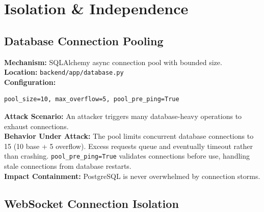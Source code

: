 \documentclass[11pt,a4paper]{article}
\begin{document}
\section{Isolation \& Independence}

\subsection{Database Connection Pooling}

\begin{tcolorbox}[colback=toleranceamber!5, colframe=toleranceamber]
\textbf{Mechanism:} SQLAlchemy async connection pool with bounded size.\\
\textbf{Location:} \texttt{backend/app/database.py}\\
\textbf{Configuration:}
\begin{verbatim}
pool_size=10, max_overflow=5, pool_pre_ping=True
\end{verbatim}
\textbf{Attack Scenario:} An attacker triggers many database-heavy operations to exhaust connections.\\
\textbf{Behavior Under Attack:} The pool limits concurrent database connections to 15 (10 base + 5 overflow). Excess requests queue and eventually timeout rather than crashing. \texttt{pool\_pre\_ping=True} validates connections before use, handling stale connections from database restarts.\\
\textbf{Impact Containment:} PostgreSQL is never overwhelmed by connection storms.
\end{tcolorbox}

\subsection{WebSocket Connection Isolation}
\end{document}
